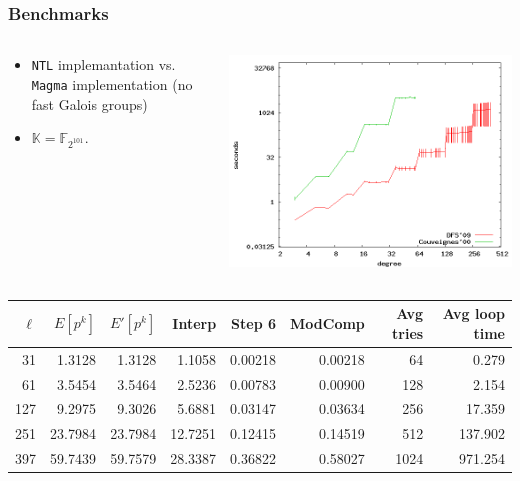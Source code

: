 \documentclass[10pt]{beamer}
\newcommand{\K}{\mathbb{K}}  %
\newcommand{\F}{\mathbb{F}}  %
\newcommand{\0}{\mathcal{O}}  %
\begin{document}

\begin{frame}
  \frametitle{Benchmarks}

  \begin{columns}
    \begin{column}{0.4\textwidth}
      \begin{itemize}
      \item \texttt{NTL} implemantation vs.  \texttt{Magma}
        implementation (no fast Galois groups)
      \item $\K = \F_{2^{101}}$.
      \end{itemize}
    \end{column}
    \begin{column}{0.6\textwidth}
      \includegraphics[width=\textwidth]{2-101}

    \end{column}
  \end{columns}
  
  \smallskip
  \footnotesize
  \centering
  \begin{tabular}{r r r r r r r r}
    \hline
    $\ell$ & $E[p^k]$ & $E'[p^k]$ & Interp & Step 6 & ModComp & Avg tries & Avg loop time\\
    \hline
    31 & 1.3128 & 1.3128 & 1.1058 & 0.00218 & 0.00218 & 64 & 0.279\\
    61 & 3.5454 & 3.5464 & 2.5236 & 0.00783 & 0.00900 & 128 & 2.154 \\
    127 & 9.2975 & 9.3026 & 5.6881 & 0.03147 & 0.03634 & 256 & 17.359 \\
    251	& 23.7984 & 23.7984 & 12.7251 & 0.12415 & 0.14519 & 512 & 137.902 \\
    397 & 59.7439 & 59.7579 & 28.3387 & 0.36822 & 0.58027 & 1024 & 971.254 \\
    \hline
  \end{tabular}
\end{frame}
\end{document}
